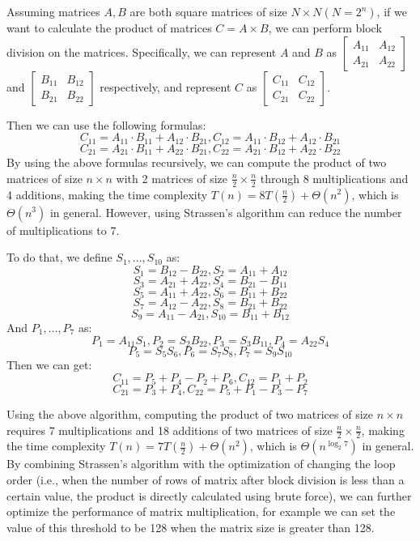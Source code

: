 \documentclass[conference]{IEEEtran}
\begin{document}
	 Assuming matrices $A, B$ are both square matrices of size $N \times N (N = 2 ^ n)$, if we want to calculate the product of matrices $C = A \times B$, we can perform block division on the matrices. Specifically, we can represent $A$ and $B$ as $\begin{bmatrix}
	 	A_{11} & A_{12}\\
	 	A_{21} & A_{22}
	 \end{bmatrix}$ and $\begin{bmatrix}
	 	B_{11} & B_{12}\\
	 	B_{21} & B_{22}
	 \end{bmatrix}$ respectively, and represent $C$ as $\begin{bmatrix}
	 	C_{11} & C_{12}\\
	 	C_{21} & C_{22}
	 \end{bmatrix}$.
 
 Then we can use the following formulas:
	 $$C_{11} = A_{11} \cdot B_{11} + A_{12} \cdot B_{21}, C_{12} = A_{11} \cdot B_{12} + A_{12} \cdot B_{21}$$
	 $$C_{21} = A_{21} \cdot B_{11} + A_{22} \cdot B_{21}, C_{22} = A_{21} \cdot B_{12} + A_{22} \cdot B_{22}$$
	 By using the above formulas recursively, we can compute the product of two matrices of size $n \times n$ with 2 matrices of size $\frac{n}{2} \times \frac{n}{2}$ through 8 multiplications and 4 additions, making the time complexity $T(n) = 8 T(\frac{n}{2}) + \Theta(n^2)$, which is $\Theta(n^3)$ in general. However, using Strassen's algorithm can reduce the number of multiplications to 7.
	 
	 To do that, we define $S_1, ..., S_{10}$ as:
	 ​ $$S_1 = B_{12} - B_{22}, S_2 = A_{11} + A_{12}$$ $$S_3 = A_{21} + A_{22}, S_4 = B_{21} - B_{11}$$ $$S_5 = A_{11} + A_{22}, S_6 = B_{11} + B_{22}$$ $$S_7 = A_{12} - A_{22}, S_8 = B_{21} + B_{22}$$ $$S_9 = A_{11} - A_{21}, S_{10} = B_{11} + B_{12}$$
	 And $P_1, ..., P_{7}$ as:
	 ​ $$P_1 = A_{11}S_1, P_2 = S_2B_{22}, P_3 = S_3B_{11}, P_4 = A_{22}S_4$$ $$P_5 = S_5S_6, P_6 = S_7S_8, P_7 = S_9S_{10}$$
	 Then we can get:
	 ​ $$C_{11} = P_5 + P_4 - P_2 + P_6, C_{12} = P_1 + P_2$$ $$C_{21} = P_3 + P_4, C_{22} = P_5 + P_1 - P_3 - P_7$$
	 
	 Using the above algorithm, computing the product of two matrices of size $n \times n$ requires 7 multiplications and 18 additions of two matrices of size $\frac{n}{2} \times \frac{n}{2}$, making the time complexity $T(n) = 7 T(\frac{n}{2}) + \Theta(n^2)$, which is $\Theta(n^{\log_2 7})$ in general. By combining Strassen's algorithm with the optimization of changing the loop order (i.e., when the number of rows of matrix after block division is less than a certain value, the product is directly calculated using brute force), we can further optimize the performance of matrix multiplication, for example we can set the value of this threshold to be 128 when the matrix size is greater than 128.
	 
\end{document}
